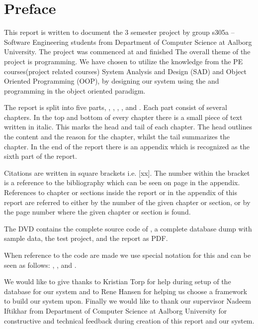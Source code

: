 \chapter*{Preface}
\label{chap:preface}
%
\emptyTop{}%
\vspace{-15mm}%
This report is written to document the 3\rd{} semester project by group s305a -- Software Engineering students from Department of Computer Science at Aalborg University. 
The project was commenced at  and finished 
The overall theme of the project is programming. 
We have chosen to utilize the knowledge from the PE courses(project related courses) System Analysis and Design (SAD) and Object Oriented Programming (OOP), by designing our system using the \ooad and programming \hdesk[] in the object oriented paradigm.  

The report is split into five parts, , , , , and . Each part consist of several chapters. In the top and bottom of every chapter there is a small piece of text written in italic. This marks the head and tail of each chapter. The head outlines the content and the reason for the chapter, whilst the tail summarizes the chapter.
In the end of the report there is an appendix which is recognized as the sixth part of the report.

Citations are written in square brackets i.e. [xx]. The number within the bracket is a reference to the bibliography which can be seen on page \pageref{chap:bib} in the appendix.
References to chapter or sections inside the report or in the appendix of this report are referred to either by the number of the given chapter or section, or by the page number where the given chapter or section is found.


The DVD contains the complete source code of \hdesk[], a complete database dump with sample data, the test project, and the report as PDF.  

When reference to the code are made we use special notation for this and can be seen as follows: , ,  and .

We would like to give thanks to Kristian Torp for help during setup of the database for our system and to Rene Hansen for helping us choose a framework to build our system upon.
Finally we would like to thank our supervisor Nadeem Iftikhar from Department of Computer Science at Aalborg University for constructive and technical feedback during creation of this report and our system.